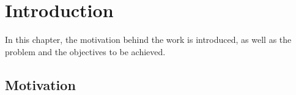\newcommand{\SubItem}[1]{
	{\setlength\itemindent{15pt} \item[-] #1}
}

\theoremstyle{definition}
\newtheorem{definition}{Definition}[section]

\chapter{Introduction}
\label{chapter:introduction}

In this chapter, the motivation behind the work is introduced, as well as the problem and the objectives to be achieved. 






\section{Motivation}
\label{section:motivation}


